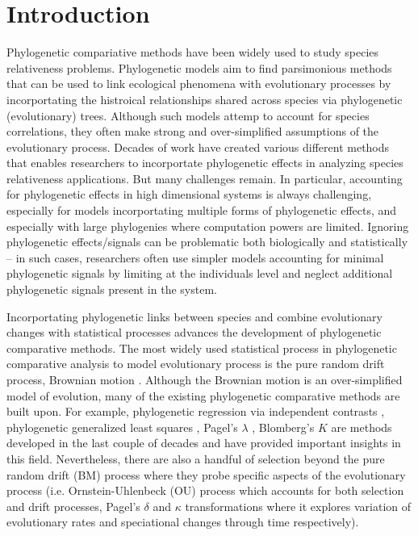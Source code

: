 \section{Introduction}

Phylogenetic compariative methods have been widely used to study species relativeness problems.
Phylogenetic models aim to find parsimonious methods that can be used to link ecological phenomena with evolutionary processes by incorportating the histroical relationships shared across species via phylogenetic (evolutionary) trees. 
Although such models attemp to account for species correlations, they often make strong and over-simplified assumptions of the evolutionary process. 
Decades of work have created various different methods that enables researchers to incorportate phylogenetic effects in analyzing species relativeness applications.
But many challenges remain.
In particular, accounting for phylogenetic effects in high dimensional systems is always challenging, especially for models incorportating multiple forms of phylogenetic effects, and especially with large phylogenies where computation powers are limited.
Ignoring phylogenetic effects/signals can be problematic both biologically and statistically \cite{felsenstein1985phylogenies, li2017statistical} -- in such cases, researchers often use simpler models accounting for minimal phylogenetic signals by limiting at the individuals level and neglect additional phylogenetic signals present in the system.

Incorportating phylogenetic links between species and combine evolutionary changes with statistical processes advances the development of phylogenetic comparative methods.
The most widely used statistical process in phylogenetic comparative analysis to model evolutionary process is the pure random drift process, Brownian motion \citep{felsenstein1973maximum}. 
Although the Brownian motion is an over-simplified model of evolution, many of the existing phylogenetic comparative methods are built upon.
For example, phylogenetic regression via independent contrasts \citep{felsenstein1985phylogenies}, phylogenetic generalized least squares \citep{grafen1989phylogenetic}, Pagel's $\lambda$ \citep{pagel1999inferring}, Blomberg's $K$ \citep{blomgerg2003} are methods developed in the last couple of decades and have provided important insights in this field. 
Nevertheless, there are also a handful of selection beyond the pure random drift (BM) process where they probe specific aspects of the evolutionary process (i.e. Ornstein-Uhlenbeck (OU) process which accounts for both selection and drift processes, Pagel's $\delta$ and $\kappa$ transformations where it explores variation of evolutionary rates and speciational changes through time respectively).



